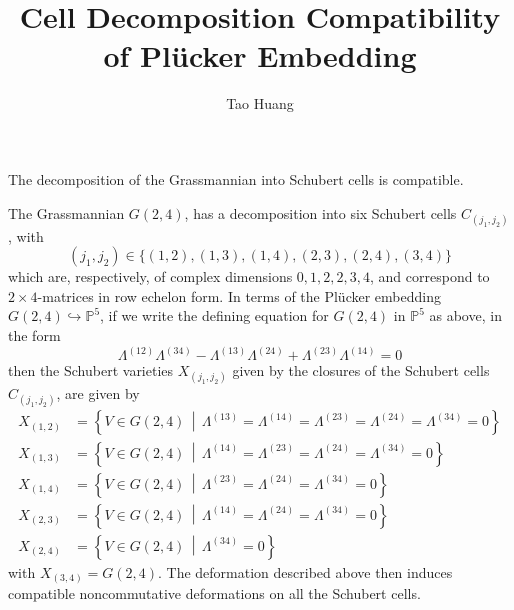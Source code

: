 \documentclass[11pt]{homework}
\title{Cell Decomposition Compatibility of Plücker Embedding}
\author{Tao Huang}
\begin{document}
\maketitle


The decomposition of the Grassmannian into Schubert cells is compatible. 

\begin{example}
    The Grassmannian $G(2, 4)$, has a decomposition into six Schubert cells $C_{\left(j_{1}, j_{2}\right)}$, with
    \begin{equation*}
        \left(j_{1}, j_{2}\right) \in\{(1,2),(1,3),(1,4),(2,3),(2,4),(3,4)\}
    \end{equation*}
    which are, respectively, of complex dimensions $0,1,2,2,3,4$, and correspond to $2 \times 4$-matrices in row echelon form. In terms of the Plücker embedding $G(2, 4) \hookrightarrow \mathbb{P}^{5}$, if we write the defining equation for $G(2, 4)$ in $\mathbb{P}^{5}$ as above, in the form
    \begin{equation*}
        \Lambda^{(12)} \Lambda^{(34)}-\Lambda^{(13)} \Lambda^{(24)}+\Lambda^{(23)} \Lambda^{(14)}=0
    \end{equation*}
    then the Schubert varieties $X_{\left(j_{1}, j_{2}\right)}$ given by the closures of the Schubert cells $C_{\left(j_{1}, j_{2}\right)}$, are given by
    \begin{align*}
        X_{(1,2)}&=\left\{V \in G(2, 4) \, \middle | \, \Lambda^{(13)}=\Lambda^{(14)}=\Lambda^{(23)}=\Lambda^{(24)}=\Lambda^{(34)}=0\right\} \\
        X_{(1,3)}&=\left\{V \in G(2, 4) \, \middle | \, \Lambda^{(14)}=\Lambda^{(23)}=\Lambda^{(24)}=\Lambda^{(34)}=0\right\} \\
        X_{(1,4)}&=\left\{V \in G(2, 4) \, \middle | \, \Lambda^{(23)}=\Lambda^{(24)}=\Lambda^{(34)}=0\right\} \\
        X_{(2,3)}&=\left\{V \in G(2, 4) \, \middle | \, \Lambda^{(14)}=\Lambda^{(24)}=\Lambda^{(34)}=0\right\} \\
        X_{(2,4)}&=\left\{V \in G(2, 4) \, \middle | \, \Lambda^{(34)}=0\right\}
    \end{align*}
    with $X_{(3,4)}=G(2, 4) .$ The deformation described above then induces compatible noncommutative deformations on all the Schubert cells. 
\end{example}


\end{document}
